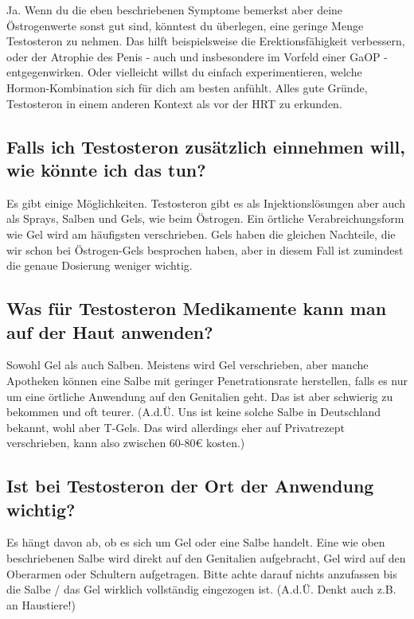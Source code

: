 \documentclass{article}
\begin{document}
Ja. Wenn du die eben beschriebenen Symptome bemerkst aber deine Östrogenwerte sonst gut sind, könntest du überlegen, eine geringe Menge Testosteron zu nehmen. Das hilft beispielsweise die Erektionsfähigkeit verbessern, oder der Atrophie des Penis - auch und insbesondere im Vorfeld einer GaOP - entgegenwirken. Oder vielleicht willst du einfach experimentieren, welche Hormon-Kombination sich für dich am besten anfühlt. Alles gute Gründe, Testosteron in einem anderen Kontext als vor der HRT zu erkunden.

\subsection{Falls ich Testosteron zusätzlich einnehmen will, wie könnte ich das tun?}

Es gibt einige Möglichkeiten. Testosteron gibt es als Injektionslösungen aber auch als Sprays, Salben und Gels, wie beim Östrogen. Ein örtliche Verabreichungsform wie Gel wird am häufigsten verschrieben. Gels haben die gleichen Nachteile, die wir schon bei Östrogen-Gels besprochen haben, aber in diesem Fall ist zumindest die genaue Dosierung weniger wichtig.

\subsection{Was für Testosteron Medikamente kann man auf der Haut anwenden?}

Sowohl Gel als auch Salben. Meistens wird Gel verschrieben, aber manche Apotheken können eine Salbe mit geringer Penetrationsrate herstellen, falls es nur um eine örtliche Anwendung auf den Genitalien geht. Das ist aber schwierig zu bekommen und oft teurer. (A.d.Ü. Uns ist keine solche Salbe in Deutschland bekannt, wohl aber T-Gels. Das wird allerdings eher auf Privatrezept verschrieben, kann also zwischen 60-80€ kosten.)

\subsection{Ist bei Testosteron der Ort der Anwendung wichtig?}

Es hängt davon ab, ob es sich um Gel oder eine Salbe handelt. Eine wie oben beschriebenen Salbe wird direkt auf den Genitalien aufgebracht, Gel wird auf den Oberarmen oder Schultern aufgetragen. Bitte achte darauf nichts anzufassen bis die Salbe / das Gel wirklich vollständig eingezogen ist. (A.d.Ü. Denkt auch z.B. an Haustiere!)
\end{document}
